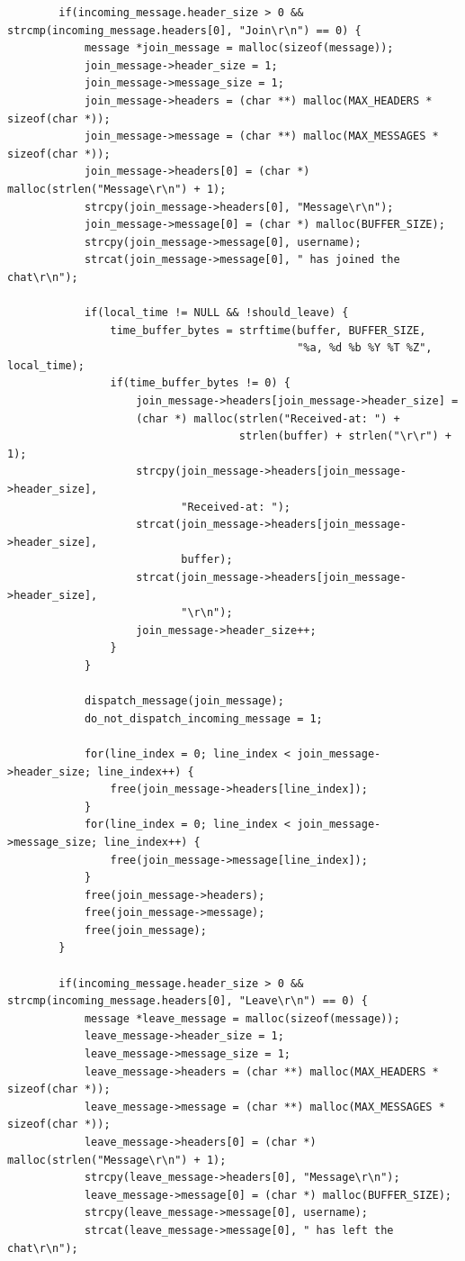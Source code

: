 \documentclass{article}
\begin{document}
\begin{verbatim}
        if(incoming_message.header_size > 0 && strcmp(incoming_message.headers[0], "Join\r\n") == 0) {
            message *join_message = malloc(sizeof(message));
            join_message->header_size = 1;
            join_message->message_size = 1;
            join_message->headers = (char **) malloc(MAX_HEADERS * sizeof(char *));
            join_message->message = (char **) malloc(MAX_MESSAGES * sizeof(char *));
            join_message->headers[0] = (char *) malloc(strlen("Message\r\n") + 1);
            strcpy(join_message->headers[0], "Message\r\n");
            join_message->message[0] = (char *) malloc(BUFFER_SIZE);
            strcpy(join_message->message[0], username);
            strcat(join_message->message[0], " has joined the chat\r\n");
            
            if(local_time != NULL && !should_leave) {
                time_buffer_bytes = strftime(buffer, BUFFER_SIZE,
                                             "%a, %d %b %Y %T %Z", local_time);
                if(time_buffer_bytes != 0) {
                    join_message->headers[join_message->header_size] =
                    (char *) malloc(strlen("Received-at: ") +
                                    strlen(buffer) + strlen("\r\r") + 1);
                    strcpy(join_message->headers[join_message->header_size],
                           "Received-at: ");
                    strcat(join_message->headers[join_message->header_size],
                           buffer);
                    strcat(join_message->headers[join_message->header_size],
                           "\r\n");
                    join_message->header_size++;
                }
            }
            
            dispatch_message(join_message);
            do_not_dispatch_incoming_message = 1;
            
            for(line_index = 0; line_index < join_message->header_size; line_index++) {
                free(join_message->headers[line_index]);
            }
            for(line_index = 0; line_index < join_message->message_size; line_index++) {
                free(join_message->message[line_index]);
            }
            free(join_message->headers);
            free(join_message->message);
            free(join_message);
        }
        
        if(incoming_message.header_size > 0 && strcmp(incoming_message.headers[0], "Leave\r\n") == 0) {
            message *leave_message = malloc(sizeof(message));
            leave_message->header_size = 1;
            leave_message->message_size = 1;
            leave_message->headers = (char **) malloc(MAX_HEADERS * sizeof(char *));
            leave_message->message = (char **) malloc(MAX_MESSAGES * sizeof(char *));
            leave_message->headers[0] = (char *) malloc(strlen("Message\r\n") + 1);
            strcpy(leave_message->headers[0], "Message\r\n");
            leave_message->message[0] = (char *) malloc(BUFFER_SIZE);
            strcpy(leave_message->message[0], username);
            strcat(leave_message->message[0], " has left the chat\r\n");
            

\end{verbatim}
\end{document}
